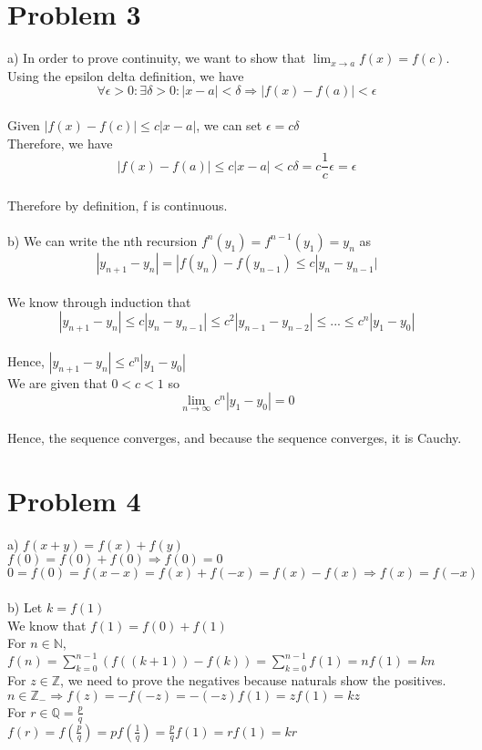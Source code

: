 \documentclass{article}
\begin{document}
\section*{Problem 3}
a) In order to prove continuity, we want to show that $\lim_{x \to a}f(x) = f(c)$.
\\Using the epsilon delta definition, we have $$\forall \epsilon > 0 : \exists \delta > 0 : |x - a| < \delta \Rightarrow |f(x) - f(a)| < \epsilon$$
\\Given $|f(x) - f(c)| \leq c|x - a|$, we can set $\epsilon = c\delta$
\\Therefore, we have $$|f(x) - f(a)| \leq c|x - a| < c\delta = c\frac{1}{c}\epsilon = \epsilon$$
\\Therefore by definition, f is continuous.
\\
\\b) We can write the nth recursion $f^n(y_1) = f^{n-1}(y_1) = y_n$ as $$|y_{n+1} - y_n| = |f(y_n) - f(y_{n-1}) \leq c|y_n - y_{n-1}|$$
\\We know through induction that $$|y_{n+1} - y_n| \leq c|y_n - y_{n-1}| \leq c^2|y_{n-1} - y_{n-2}| \leq ... \leq c^n|y_1 - y_0|$$
\\Hence, $|y_{n+1} - y_n| \leq c^n|y_1 - y_0|$
\\We are given that $0 < c < 1$ so $$\lim_{n \to \infty} c^n|y_1 - y_0| = 0$$
\\Hence, the sequence converges, and because the sequence converges, it is Cauchy.

\section*{Problem 4}
a) $f(x + y) = f(x) + f(y)$
\\$f(0) = f(0) + f(0) \Rightarrow f(0) = 0$
\\$0 = f(0) = f(x - x) = f(x) + f(-x) = f(x) - f(x) \Rightarrow f(x) = f(-x)$
\\
\\b) Let $k = f(1)$
\\We know that $f(1) = f(0) + f(1)$
\\For $n \in \mathbb{N}$, 
\\$f(n) = \sum_{k=0}^{n-1} (f((k+1)) - f(k)) = \sum_{k=0}^{n-1} f(1) = nf(1) = kn$
\\For $z \in \mathbb{Z}$, we need to prove the negatives because naturals show the positives. 
\\$n \in \mathbb{Z}_- \Rightarrow f(z) = -f(-z) = -(-z)f(1) = zf(1) = kz$
\\For $r \in \mathbb{Q} = \frac{p}{q}$
\\$f(r) = f(\frac{p}{q}) = pf(\frac{1}{q}) = \frac{p}{q}f(1) = rf(1) = kr$
\end{document}
